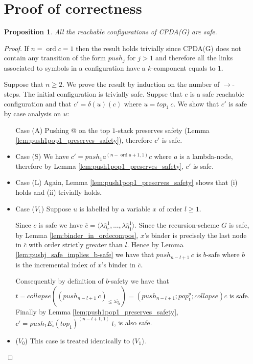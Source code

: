\documentclass{article}
\newcommand{\ord}{\mathop{\mathrm{ord}}}
\newcommand{\prefixof}{\leqslant}
\newtheorem{proposition}{Proposition}[section]
\theoremstyle{remark}
\theoremstyle{definition}
\newcommand\orddec\overline
\begin{document}
\section{Proof of correctness}

\begin{proposition}
All the reachable configurations of CPDA(G) are safe.
\end{proposition}
\begin{proof}
If $n =\ord{c} =1$ then the result holds trivially since CPDA(G) does not contain
any transition of the form $push_j$ for $j>1$ and therefore all the links associated to symbols in a configuration have a $k$-component equals to $1$.

Suppose that $n\geq 2$. We prove the result by induction on the number of
$\rightarrow$-steps. The initial configuration is trivially safe. 
Suppse that $c$ is a safe reachable configuration and that
$c'=\delta(u)(c)$ where $u = top_1\ c$.
We show that $c'$ is safe by case analysis on $u$:
\begin{itemize}
\item[Case (A)] Pushing @ on the top $1$-stack preserves safety (Lemma
\ref{lem:push1pop1_preserves_safety}), therefore $c'$ is safe.

\item Case (S)
We have $c' = push_1 a^{(n-\ord{a}+1,1)} c$ where $a$ is a
lambda-node, therefore by Lemma \ref{lem:push1pop1_preserves_safety},
$c'$ is safe.

\item Case (L) Again, Lemma \ref{lem:push1pop1_preserves_safety}
shows that (i) holds and (ii) trivially holds.

\item Case ($V_1$) Suppose $u$ is labelled by a variable $x$ of order $l\geq 1$.

Since $c$ is safe we have $\orddec{c} = \langle \lambda
\overline{\eta}_r^1 , \ldots, \lambda \overline{\eta}_1^1
\rangle$.
Since the recursion-scheme $G$ is safe, by Lemma \ref{lem:binder_in_ordecompos}, $x$'s binder is precisely the
last node in $\orddec{c}$ with order strictly greater than $l$.
Hence by Lemma \ref{lem:pushj_safe_implies_b-safe}
we have that $push_{n-l+1}\ c$ is $b$-safe where $b$ is the
incremental index of $x$'s binder in $\orddec{c}$.

Consequently by definition of $b$-safety we have that
$t = collapse \left( (push_{n-l+1}~ c)_{\prefixof \lambda
\overline{\eta}_{b}} \right) = (push_{n-l+1};pop_1^p;collapse)
c$ is safe. Finally by
Lemma \ref{lem:push1pop1_preserves_safety}, $c' = push_1 E_i(top_1)^{(n-l+1,1)}\ t$, is also safe.

\item ($V_0$) This case is treated identically to ($V_1$).
\end{itemize}
\end{proof}
\end{document}
